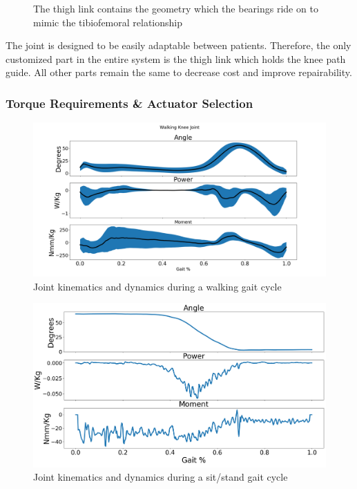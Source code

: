 \begin{figure}[ht!]
    \centering
    \caption{The thigh link contains the geometry which the bearings ride on to mimic the tibiofemoral relationship}
    \label{fig:CenterPlateGeometry}
\end{figure}

The joint is designed to be easily adaptable between patients. Therefore, the only customized part in the entire system is the thigh link which holds the knee path guide. All other parts remain the same to decrease cost and improve repairability.

\subsubsection{Torque Requirements \& Actuator Selection}

\begin{figure}[ht!]
    \centering
    \includegraphics[width=\linewidth]{Figures/Design/WalkingPowerCurveKnee.png}
    \caption{Joint kinematics and dynamics during a walking gait cycle \cite{SpringWrapClutchKnee}}
    \label{fig:WalkingPowerCurve}
\end{figure}

\begin{figure}[ht!]
    \centering
    \includegraphics[width=\linewidth]{Figures/Design/SitStandPowerCurveKnee.png}
    \caption{Joint kinematics and dynamics during a sit/stand gait cycle \cite{SpringWrapClutchKnee}}
    \label{fig:SitStandPowerCurve}
\end{figure}

